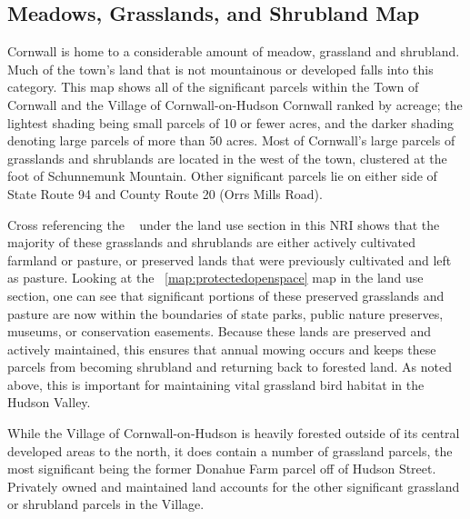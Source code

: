 \subsection*{Meadows, Grasslands, and Shrubland Map}
Cornwall is home to a considerable amount of meadow, grassland and shrubland.
Much of the town’s land that is not mountainous or developed falls into this
category. This map shows all of the significant parcels within the Town of
Cornwall and the Village of Cornwall-on-Hudson Cornwall ranked by acreage; the
lightest shading being small parcels of 10 or fewer acres, and the darker
shading denoting large parcels of more than 50 acres. Most of Cornwall's large
parcels of grasslands and shrublands are located in the west of the town,
clustered at the foot of Schunnemunk Mountain. Other significant parcels lie on
either side of State Route 94 and County Route 20 (Orrs Mills Road).
\par
Cross referencing the ~ under the land use section in
this NRI shows that the majority of these grasslands and shrublands are either
actively cultivated farmland or pasture, or preserved lands that were
previously cultivated and left as pasture. Looking at the ~\ref{map:protectedopenspace}
map in the land use section, one can see that significant portions
of these preserved grasslands and pasture are now within the boundaries of
state parks, public nature preserves, museums, or conservation easements.
Because these lands are preserved and actively maintained, this ensures that
annual mowing occurs and keeps these parcels from becoming shrubland and
returning back to forested land. As noted above, this is important for
maintaining vital grassland bird habitat in the Hudson Valley.
\par
While the Village of Cornwall-on-Hudson is heavily forested outside of its
central developed areas to the north, it does contain a number of grassland
parcels, the most significant being the former Donahue Farm parcel off of
Hudson Street. Privately owned and maintained land accounts for the other
significant grassland or shrubland parcels in the Village.

~\label{map:meadowgrasslandsandshrublands}